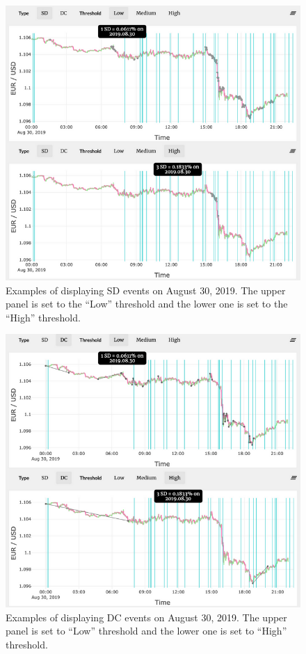 \documentclass[sigconf]{acmart}
\begin{document}
\begin{figure}[h]
  \centering
  \includegraphics[width=\linewidth]{sd.png}
  \caption{Examples of displaying SD events on August 30, 2019. The upper panel is set to the ``Low'' threshold and the lower one is set to the ``High'' threshold.}
  \Description{}
  \label{fig:SD}
\end{figure}

\begin{figure}[h]
  \centering
  \includegraphics[width=\linewidth]{dc.png}
  \caption{Examples of displaying DC events on August 30, 2019. The upper panel is set to ``Low'' threshold and the lower one is set to ``High'' threshold.}
  \Description{}
  \label{fig:DC}
\end{figure}
\end{document}
